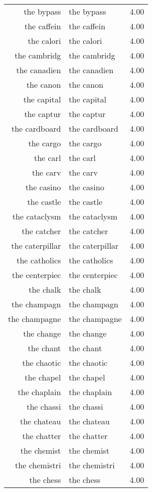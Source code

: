 \begin{table}[ht]
\begin{tabular}{rlr}
  the bypass & the bypass & 4.00 \\ 
  the caffein & the caffein & 4.00 \\ 
  the calori & the calori & 4.00 \\ 
  the cambridg & the cambridg & 4.00 \\ 
  the canadien & the canadien & 4.00 \\ 
  the canon & the canon & 4.00 \\ 
  the capital & the capital & 4.00 \\ 
  the captur & the captur & 4.00 \\ 
  the cardboard & the cardboard & 4.00 \\ 
  the cargo & the cargo & 4.00 \\ 
  the carl & the carl & 4.00 \\ 
  the carv & the carv & 4.00 \\ 
  the casino & the casino & 4.00 \\ 
  the castle & the castle & 4.00 \\ 
  the cataclysm & the cataclysm & 4.00 \\ 
  the catcher & the catcher & 4.00 \\ 
  the caterpillar & the caterpillar & 4.00 \\ 
  the catholics & the catholics & 4.00 \\ 
  the centerpiec & the centerpiec & 4.00 \\ 
  the chalk & the chalk & 4.00 \\ 
  the champagn & the champagn & 4.00 \\ 
  the champagne & the champagne & 4.00 \\ 
  the change & the change & 4.00 \\ 
  the chant & the chant & 4.00 \\ 
  the chaotic & the chaotic & 4.00 \\ 
  the chapel & the chapel & 4.00 \\ 
  the chaplain & the chaplain & 4.00 \\ 
  the chassi & the chassi & 4.00 \\ 
  the chateau & the chateau & 4.00 \\ 
  the chatter & the chatter & 4.00 \\ 
  the chemist & the chemist & 4.00 \\ 
  the chemistri & the chemistri & 4.00 \\ 
  the chess & the chess & 4.00 \\ 

\end{tabular}
\end{table}
